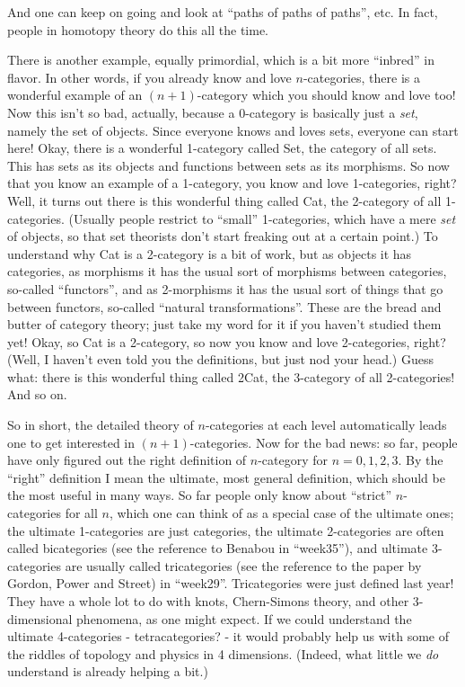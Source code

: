 \documentclass{article}
\begin{document}
And one can keep on going and look at ``paths of paths of paths'', etc.
In fact, people in homotopy theory do this all the time.

There is another example, equally primordial, which is a bit more
``inbred'' in flavor. In other words, if you already know and love
\(n\)-categories, there is a wonderful example of an \((n+1)\)-category
which you should know and love too! Now this isn't so bad, actually,
because a 0-category is basically just a \emph{set}, namely the set of
objects. Since everyone knows and loves sets, everyone can start here!
Okay, there is a wonderful 1-category called Set, the category of all
sets. This has sets as its objects and functions between sets as its
morphisms. So now that you know an example of a 1-category, you know and
love 1-categories, right? Well, it turns out there is this wonderful
thing called Cat, the 2-category of all 1-categories. (Usually people
restrict to ``small'' 1-categories, which have a mere \emph{set} of
objects, so that set theorists don't start freaking out at a certain
point.) To understand why Cat is a 2-category is a bit of work, but as
objects it has categories, as morphisms it has the usual sort of
morphisms between categories, so-called ``functors'', and as 2-morphisms
it has the usual sort of things that go between functors, so-called
``natural transformations''. These are the bread and butter of category
theory; just take my word for it if you haven't studied them yet! Okay,
so Cat is a 2-category, so now you know and love 2-categories, right?
(Well, I haven't even told you the definitions, but just nod your head.)
Guess what: there is this wonderful thing called 2Cat, the 3-category of
all 2-categories! And so on.

So in short, the detailed theory of \(n\)-categories at each level
automatically leads one to get interested in \((n+1)\)-categories. Now
for the bad news: so far, people have only figured out the right
definition of \(n\)-category for \(n = 0, 1, 2, 3\). By the ``right''
definition I mean the ultimate, most general definition, which should be
the most useful in many ways. So far people only know about ``strict''
\(n\)-categories for all \(n\), which one can think of as a special case
of the ultimate ones; the ultimate 1-categories are just categories, the
ultimate 2-categories are often called bicategories (see the reference
to Benabou in ``week35''), and ultimate 3-categories are usually called
tricategories (see the reference to the paper by Gordon, Power and
Street) in ``week29''. Tricategories were just defined last year! They
have a whole lot to do with knots, Chern-Simons theory, and other
3-dimensional phenomena, as one might expect. If we could understand the
ultimate 4-categories - tetracategories? - it would probably help us
with some of the riddles of topology and physics in 4 dimensions.
(Indeed, what little we \emph{do} understand is already helping a bit.)
\end{document}
